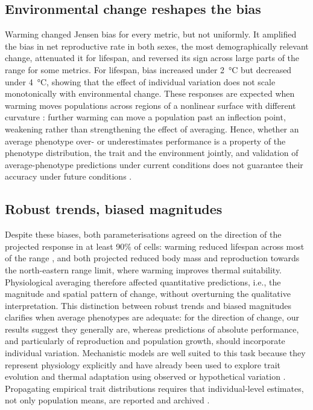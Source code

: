 \documentclass[12pt]{article}
\begin{document}
\subsection*{Environmental change reshapes the bias}

Warming changed Jensen bias for every metric, but not uniformly. It amplified the bias in net reproductive rate in both sexes, the most demographically relevant change, attenuated it for lifespan, and reversed its sign across large parts of the range for some metrics. For lifespan, bias increased under \qty{+2}{\celsius} but decreased under \qty{+4}{\celsius}, showing that the effect of individual variation does not scale monotonically with environmental change. These responses are expected when warming moves populations across regions of a nonlinear surface with different curvature \parencite{angillettajr.2009,kingsolver2016,li2021}: further warming can move a population past an inflection point, weakening rather than strengthening the effect of averaging. Hence, whether an average phenotype over- or underestimates performance is a property of the phenotype distribution, the trait and the environment jointly, and validation of average-phenotype predictions under current conditions does not guarantee their accuracy under future conditions \parencite{buckley2018,buckley2023,cannistra2024}.

\subsection*{Robust trends, biased magnitudes}

Despite these biases, both parameterisations agreed on the direction of the projected response in at least 90\% of cells: warming reduced lifespan across most of the range \parencite{munch2009,burraco2020}, and both projected reduced body mass and reproduction towards the north-eastern range limit, where warming improves thermal suitability. Physiological averaging therefore affected quantitative predictions, i.e., the magnitude and spatial pattern of change, without overturning the qualitative interpretation. This distinction between robust trends and biased magnitudes clarifies when average phenotypes are adequate: for the direction of change, our results suggest they generally are, whereas predictions of absolute performance, and particularly of reproduction and population growth, should incorporate individual variation. Mechanistic models are well suited to this task because they represent physiology explicitly and have already been used to explore trait evolution and thermal adaptation using observed or hypothetical variation \parencite{dejong1996,kingsolver2016,enriquez-urzelai2020,riddell2022,riddell2023a}. Propagating empirical trait distributions requires that individual-level estimates, not only population means, are reported and archived \parencite{wolf2023}.
\end{document}
